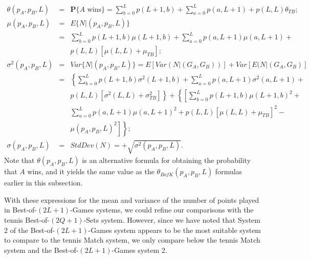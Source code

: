 \documentclass[11pt]{article}
\theoremstyle{plain}
\theoremstyle{definition}
\renewcommand{\Pr}{\mathbf{P}}
\begin{document}
\begin{eqnarray*}
    \theta(p_A,p_B,L) & = & \Pr\{\mbox{$A$\ wins}\} = \sum_{b=0}^L p(L+1,b) + \sum_{a=0}^L p(a,L+1)  + p(L,L) \theta_{TB}; \\
    \mu(p_A,p_B,L) & = & E\{N|(p_A,p_B,L)\} \\
    & = & \sum_{b=0}^L p(L+1,b) \mu(L+1,b) + \sum_{a=0}^L p(a,L+1) \mu(a,L+1) + \\ &&  p(L,L) [\mu(L,L) + \mu_{TB}]; \\
\sigma^2(p_A,p_B,L) &  = & Var\{N|(p_A,p_B,L)\} = E[Var(N|(G_A,G_B))] + Var[E(N|(G_A,G_B)]  \\
    & = & \left\{\sum_{b=0}^L p(L+1,b) \sigma^2(L+1,b) + \sum_{a=0}^L p(a,L+1) \sigma^2(a,L+1) + \right. \\ &&  \left. p(L,L) [\sigma^2(L,L) + \sigma_{TB}^2] \right\} +  \left\{ \left[ \sum_{b=0}^L p(L+1,b) \mu(L+1,b)^2 + \right.\right. \\ && \left.\left.\sum_{a=0}^L p(a,L+1) \mu(a,L+1)^2  +   p(L,L) [\mu(L,L) + \mu_{TB}]^2 - \right.\right. \\ && \left.\left. 
    \mu(p_A,p_B,L)^2 \right]\right\}; \\
     \sigma(p_A,p_B,L)  & = & StdDev(N) = +\sqrt{\sigma^2(p_A,p_B,L)}.
\end{eqnarray*}
%
Note that $\theta(p_A,p_B,L)$ is an alternative formula for obtaining the probability that $A$ wins, and it yields the same value as the $\theta_{BofK}(p_A,p_B,L)$ formulas earlier in this subsection.

With these expressions for the mean and variance of the number of points played in Best-of-$(2L+1)$-Games systems, we could refine our comparisons with the tennis Best-of-$(2Q+1)$-Sets system. However, since we have noted that System 2 of the Best-of-$(2L+1)$-Games system appears to be the most suitable system to compare to the tennis Match system, we only compare below the tennis Match system and the Best-of-$(2L+1)$-Games system 2.
\end{document}
